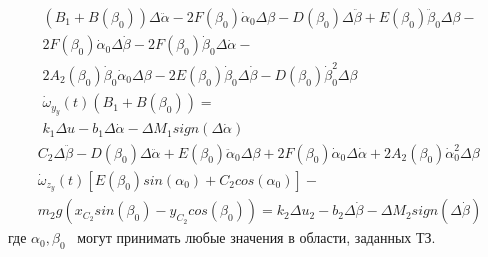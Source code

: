 \begin{equation}
\label{eq:p3:55}
\begin{multlined}
\left( B_{1}+B \left( \beta _{0} \right) \right) \Delta \ddot \alpha -
2F \left( \beta _{0} \right)\dot \alpha _{0} \Delta \beta -
D \left( \beta _{0} \right) \Delta \ddot \beta +
E \left( \beta _{0} \right) \ddot \beta _{0} \Delta \beta -\\
2F \left( \beta _{0} \right) \dot \alpha _{0} \Delta \dot \beta -
2F \left( \beta _{0} \right) \dot \beta _{0} \Delta \dot \alpha -\\
2A_{2} \left( \beta _{0} \right) \dot \beta _{0} \dot \alpha _{0} \Delta \beta -
2E \left( \beta _{0} \right) \dot \beta _{0} \Delta \dot \beta -
D \left( \beta _{0} \right) \dot \beta _{0}^{2} \Delta \beta \\
\dot \omega _{y_{y}} ( t ) ( B_{1}+B ( \beta_0 ) )=\\
k_{1} \Delta u-
b_{1} \Delta \dot \alpha - \Delta M_{1}sign \left( \Delta \dot \alpha \right)
\end{multlined}
\end{equation}
\begin{equation}
\label{eq:p3:56}
\begin{multlined}
C_{2} \Delta \ddot \beta -
D \left( \beta _{0} \right) \Delta \ddot \alpha +
E \left( \beta _{0} \right) \ddot \alpha _{0} \Delta \beta +
2F \left( \beta _{0} \right) \dot \alpha _{0} \Delta \dot \alpha +
2A_{2} \left( \beta _{0} \right) \dot \alpha _{0}^{2} \Delta \beta \\
\dot \omega _{z_{y}} \left( t \right) \left[ E \left( \beta_0 \right) sin \left( \alpha_0 \right) +C_{2}cos \left( \alpha_0 \right) \right]-\\
m_{2}g \left( 
x_{C_{2}}sin \left( \beta _{0} \right) -
y_{C_{2}}cos \left( \beta _{0} \right) 
\right) =
k_{2} \Delta u_{2}-
b_{2} \Delta \dot \beta - 
\Delta M_{2}sign \left( \Delta \dot \beta \right) 
\end{multlined}
\end{equation}
где \( \alpha _{0}, \beta _{0} \) \ могут принимать любые значения в области, заданных ТЗ. 

